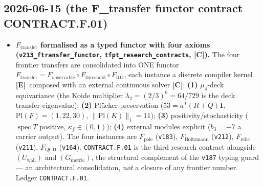 \documentclass[11pt]{article}
\providecommand{\mE}{\textbf{[E]}}\providecommand{\mC}{\textbf{[C]}}
\begin{document}
\subsection*{2026-06-15 (the F\_transfer functor contract CONTRACT.F.01)}
\begin{itemize}
\item \textbf{$F_{\mathrm{transfer}}$ formalised as a typed functor with four axioms
  (\texttt{v213\_ftransfer\_functor}, \texttt{tfpt\_research\_contracts}, \mC).} The four frontier transfers
  are consolidated into ONE functor $F_{\mathrm{transfer}}=F_{\mathrm{observable}}\circ F_{\mathrm{threshold}}
  \circ F_{\mathrm{RG}}$, each instance a discrete compiler kernel \mE\ composed with an external continuous
  solver \mC: \textbf{(1)} $\mu_4$-deck equivariance (the Koide multiplier $\lambda_2{=}(2/3)^6{=}64/729$ is
  the deck transfer eigenvalue); \textbf{(2)} Pl\"ucker preservation ($53{=}a^T(R{+}Q)\mathbf1$,
  $\mathrm{Pl}(F){=}(1,22,30)$, $\|\mathrm{Pl}(K)\|_1{=}11$); \textbf{(3)} positivity/stochasticity
  ($\operatorname{spec}T$ positive, $\kappa_f\in(0,1)$); \textbf{(4)} external modules explicit
  ($b_3{=}{-}7$ a carrier output). The four instances are $F_{\mathrm{pole}}$ (\texttt{v183}),
  $F_{\mathrm{Boltzmann}}$ (\texttt{v212}), $F_{\mathrm{relic}}$ (\texttt{v211}), $F_{\mathrm{QCD}}$
  (\texttt{v164}). \texttt{CONTRACT.F.01} is the third research contract alongside $(U_{\mathrm{wall}})$ and
  $(G_{\mathrm{metric}})$, the structural complement of the \texttt{v187} typing guard --- an architectural
  consolidation, \emph{not} a closure of any frontier number. Ledger \texttt{CONTRACT.F.01}.
\end{itemize}
\end{document}

